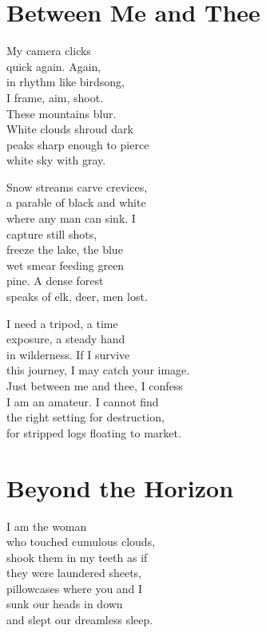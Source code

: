 \documentclass[twoside,10pt]{book}
\begin{document}
\clearpage
\section{Between Me and Thee}

My camera clicks\\
quick again. Again,\\
in rhythm like birdsong,\\
I frame, aim, shoot.\\
These mountains blur.\\
White clouds shroud dark\\
peaks sharp enough to pierce\\
white sky with gray.

Snow streams carve crevices,\\
a parable of black and white\\
where any man can sink. I\\
capture still shots,\\
freeze the lake, the blue\\
wet smear feeding green\\
pine. A dense forest\\
speaks of elk, deer, men lost.

I need a tripod, a time\\
exposure, a steady hand\\
in wilderness. If I survive\\
this journey, I may catch your image.\\
Just between me and thee, I confess\\
I am an amateur. I cannot find\\
the right setting for destruction,\\
for stripped logs floating to market.

\clearpage
\section{Beyond the Horizon}

I am the woman\\
who touched cumulous clouds,\\
shook them in my teeth as if\\
they were laundered sheets,\\
pillowcases where you and I\\
sunk our heads in down\\
and slept our dreamless sleep.
\end{document}
